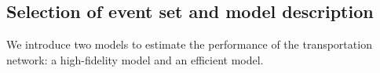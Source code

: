 %

\subsection{Selection of event set and model description}
We introduce two models to estimate the performance of the transportation network: a high-fidelity model and an efficient model.

